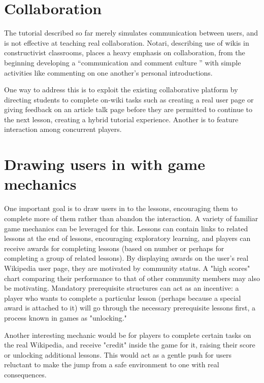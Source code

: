 \documentclass{acm_proc_article-sp}
\begin{document}
\section{Collaboration}

The tutorial described so far merely simulates communication between users, and is not effective at teaching real collaboration. Notari,\cite{Notari:2006} describing use of wikis in constructivist classrooms, places a heavy emphasis on collaboration, from the beginning developing a ``communication and comment culture '' with simple activities like commenting on one another's personal introductions.

One way to address this is to exploit the existing collaborative platform by directing students to complete on-wiki tasks such as creating a real user page or giving feedback on an article talk page before they are permitted to continue to the next lesson, creating a hybrid tutorial experience. Another is to feature interaction among concurrent players.

\section{Drawing users in with game mechanics}

One important goal is to draw users in to the lessons, encouraging them to complete more of them rather than abandon the interaction. A variety of familiar game mechanics can be leveraged for this. Lessons can contain links to related lessons at the end of lessons, encouraging exploratory learning, and players can receive awards for completing lessons (based on number or perhaps for completing a group of related lessons). By displaying awards on the user's real Wikipedia user page, they are motivated by community status. A "high scores" chart comparing their performance to that of other community members may also be motivating. Mandatory prerequisite structures can act as an incentive: a player who wants to complete a particular lesson (perhaps because a special award is attached to it) will go through the necessary prerequisite lessons first, a process known in games as "unlocking."

Another interesting mechanic would be for players to complete certain tasks on the real Wikipedia, and receive "credit" inside the game for it, raising their score or unlocking additional lessons. This would act as a gentle push for users reluctant to make the jump from a safe environment to one with real consequences.
\end{document}
